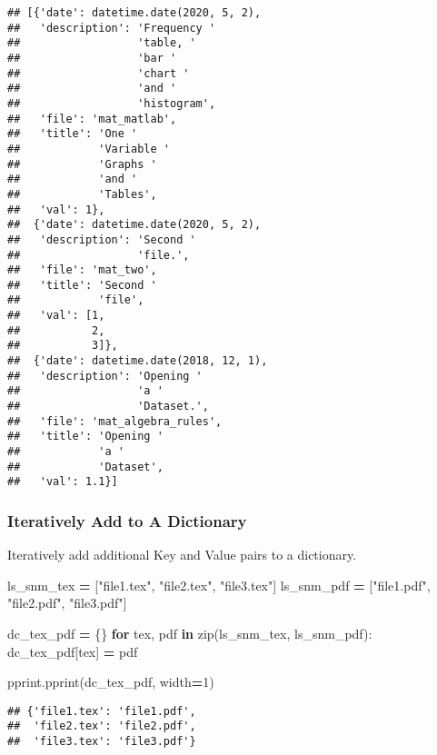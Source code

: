 \documentclass[
]{book}
\newenvironment{Shaded}{\begin{snugshade}}{\end{snugshade}}
\newcommand{\BuiltInTok}[1]{#1}
\newcommand{\ControlFlowTok}[1]{\textcolor[rgb]{0.13,0.29,0.53}{\textbf{#1}}}
\newcommand{\DecValTok}[1]{\textcolor[rgb]{0.00,0.00,0.81}{#1}}
\newcommand{\KeywordTok}[1]{\textcolor[rgb]{0.13,0.29,0.53}{\textbf{#1}}}
\newcommand{\NormalTok}[1]{#1}
\newcommand{\OperatorTok}[1]{\textcolor[rgb]{0.81,0.36,0.00}{\textbf{#1}}}
\newcommand{\StringTok}[1]{\textcolor[rgb]{0.31,0.60,0.02}{#1}}
\begin{document}
\begin{verbatim}
## [{'date': datetime.date(2020, 5, 2),
##   'description': 'Frequency '
##                  'table, '
##                  'bar '
##                  'chart '
##                  'and '
##                  'histogram',
##   'file': 'mat_matlab',
##   'title': 'One '
##            'Variable '
##            'Graphs '
##            'and '
##            'Tables',
##   'val': 1},
##  {'date': datetime.date(2020, 5, 2),
##   'description': 'Second '
##                  'file.',
##   'file': 'mat_two',
##   'title': 'Second '
##            'file',
##   'val': [1,
##           2,
##           3]},
##  {'date': datetime.date(2018, 12, 1),
##   'description': 'Opening '
##                  'a '
##                  'Dataset.',
##   'file': 'mat_algebra_rules',
##   'title': 'Opening '
##            'a '
##            'Dataset',
##   'val': 1.1}]
\end{verbatim}

\hypertarget{iteratively-add-to-a-dictionary}{%
\subsubsection{Iteratively Add to A Dictionary}\label{iteratively-add-to-a-dictionary}}

Iteratively add additional Key and Value pairs to a dictionary.

\begin{Shaded}
\begin{Highlighting}[]

\NormalTok{ls\_snm\_tex }\OperatorTok{=}\NormalTok{ [}\StringTok{"file1.tex"}\NormalTok{, }\StringTok{"file2.tex"}\NormalTok{, }\StringTok{"file3.tex"}\NormalTok{]}
\NormalTok{ls\_snm\_pdf }\OperatorTok{=}\NormalTok{ [}\StringTok{"file1.pdf"}\NormalTok{, }\StringTok{"file2.pdf"}\NormalTok{, }\StringTok{"file3.pdf"}\NormalTok{]}

\NormalTok{dc\_tex\_pdf }\OperatorTok{=}\NormalTok{ \{\}}
\ControlFlowTok{for}\NormalTok{ tex, pdf }\KeywordTok{in} \BuiltInTok{zip}\NormalTok{(ls\_snm\_tex, ls\_snm\_pdf):}
\NormalTok{  dc\_tex\_pdf[tex] }\OperatorTok{=}\NormalTok{ pdf}

\NormalTok{pprint.pprint(dc\_tex\_pdf, width}\OperatorTok{=}\DecValTok{1}\NormalTok{)}
\end{Highlighting}
\end{Shaded}

\begin{verbatim}
## {'file1.tex': 'file1.pdf',
##  'file2.tex': 'file2.pdf',
##  'file3.tex': 'file3.pdf'}
\end{verbatim}
\end{document}
